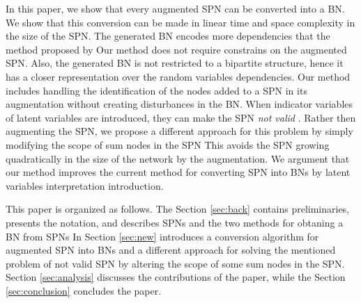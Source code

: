 In this paper, we show that every augmented SPN can be converted into a BN.
We show that this conversion can be made in linear time and space complexity in the size of the SPN.
The generated BN encodes more dependencies that the method proposed by \cite{zhao2015relationship}
Our method does not require constrains on the augmented SPN.
Also, the generated BN is not restricted to a bipartite structure, hence it has a closer representation over the random variables dependencies.
Our method includes handling the identification of the nodes added to a SPN in its augmentation without creating disturbances in the BN.
When indicator variables of latent variables are introduced, they can make the SPN \emph{not valid} \cite{peharz2015theoretical}.
Rather then augmenting the SPN, we propose a different approach for this problem by simply modifying the scope of sum nodes in the SPN
This avoids the SPN growing quadratically in the size of the network by the augmentation.
We argument that our method improves the current method for converting SPN into BNs by latent variables interpretation introduction.


This paper is organized as follows. 
The Section \ref{sec:back} contains preliminaries, presents the notation, and describes SPNs and the two methods for obtaning a BN from SPNs
In Section \ref{sec:new} introduces a conversion algorithm for augmented SPN into BNs and a different approach for solving the mentioned problem of not valid SPN by altering the scope of some sum nodes in the SPN.
Section \ref{sec:analysis} discusses the contributions of the paper, while the Section \ref{sec:conclusion} concludes the paper.

